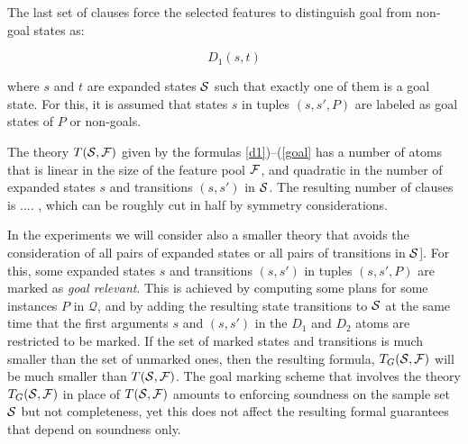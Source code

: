 \documentclass[letterpaper]{article} %
\newcommand{\Omit}[1]{}
\newcommand{\Q}{\mathcal{Q}}
\begin{document}
\Omit{ %
  Refer to this as an ``efficiency optimization'' ..
  
  such that $s < t$, and transition $(s,s')$ in ${\cal S}$. Due to the symmetry breaking caused by the constraint $s < t$,
  the following formulas are also needed

\begin{equation}
  \neg D_1(s, t) \, \Rightarrow \, \bigvee_{s'} \neg D_2(s, s', t, t')
    \label{bridge2}
\end{equation}

\noindent where the  iteration in the right hand disjunction goes over the different successor states $s'$ of the first argument
$s$ of $D_1$ that are in the sample set ${\cal S}$, $s$ and $t$ are states in ${\cal S}_1$ as before with $s < t$, and $t'$ is a
successor state of $t$ in ${\cal S}$; i.e. $(t,t') \in {\cal S}$.
}


The last  set of clauses force the selected features to distinguish goal from non-goal states as:

\begin{equation}
  D_1(s,t) 
\label{goal}
\end{equation}

\noindent where  $s$ and $t$  are expanded states  ${\cal S}$ such that exactly one of them is a goal state. 
For this, it is assumed that  states $s$ in   tuples $(s,s',P)$ are labeled as   goal states  of $P$ or non-goals.

The theory $T({\cal S},{\cal F})$ given by the formulas  \ref{d1})--(\ref{goal}
has a number of atoms that is linear in the size of the feature pool $\cal F$,
and quadratic in the number of expanded  states $s$  and transitions $(s,s')$ in ${\cal S}$.
The resulting number of clauses is ....  , which can be roughly cut in half by  symmetry considerations.

In the experiments we will   consider also  a smaller theory  that avoids the consideration of all pairs
of expanded states or all pairs of transitions in $\cal S$]. For this, some expanded states $s$ and transitions $(s,s')$ in
tuples $(s,s',P)$ are marked as \emph{goal relevant}. This is achieved by computing some plans for some instances $P$ in $\Q$, 
and by adding the resulting state transitions to ${\cal S}$ at the same time that the first
arguments $s$ and $(s,s')$ in the  $D_1$ and $D_2$ atoms are restricted to be marked.
If the set of marked states and transitions is much smaller than the set of unmarked ones, 
then the resulting formula,  $T_G({\cal S},{\cal F})$ will be much smaller than $T({\cal S},{\cal F})$.
The goal marking scheme that involves the theory $T_G({\cal S},{\cal F})$ in place of $T({\cal S},{\cal F})$
amounts to enforcing soundness on  the sample set ${\cal S}$ but not completeness, yet this does
not affect the resulting  formal guarantees that depend on soundness only. 
\end{document}
